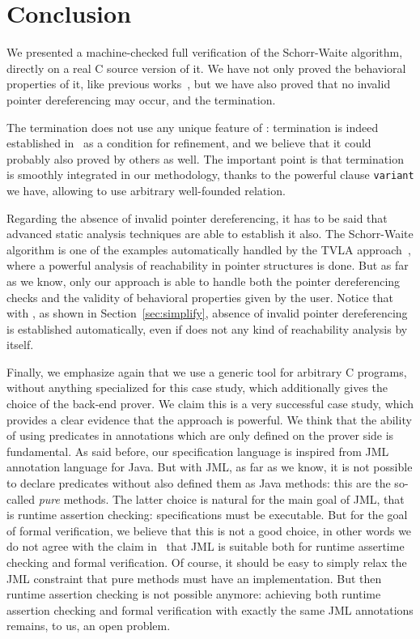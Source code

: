 \section{Conclusion}
\label{sec:conclusion}

We presented a machine-checked full verification of the Schorr-Waite
algorithm, directly on a real C source version of it. We have not only
proved the behavioral properties of it, like previous
works~\cite{bornat00mpc,mehta03cade,abrial03fme}, but we have also
proved that no invalid pointer dereferencing may occur, and the
termination.

The termination does not use any unique feature of \caduceus{}:
termination is indeed established in~\cite{abrial03fme} as a condition
for refinement, and we believe that it could probably also proved by
others as well. The important point is that termination is smoothly
integrated in our methodology, thanks to the powerful clause
\texttt{variant} we have, allowing to use arbitrary well-founded
relation.

Regarding the absence of invalid pointer dereferencing, it has to be
said that advanced static analysis techniques are able to establish it
also. The Schorr-Waite algorithm is one of the examples automatically
handled by the TVLA approach~\cite{sagiv02toplas,reps03esop}, where a powerful
analysis of reachability in pointer structures is done. But as far as
we know, only our approach is able to handle both the pointer
dereferencing checks and the validity of behavioral properties given
by the user. Notice that with \caduceus, as shown in
Section~\ref{sec:simplify}, absence of invalid pointer dereferencing
is established automatically, even if \caduceus{} does not any kind of
reachability analysis by itself.

Finally, we emphasize again that we use a generic tool for arbitrary C
programs, without anything specialized for this case study, which
additionally gives the choice of the back-end prover.  We claim this
is a very successful case study, which provides a clear evidence that
the \caduceus{} approach is powerful. We think that the ability of
using predicates in annotations which are only defined on the prover
side is fundamental. As said before, our specification language is
inspired from JML annotation language for Java. But with JML, as far
as we know, it is not possible to declare predicates without also
defined them as Java methods: this are the so-called \emph{pure}
methods. The latter choice is natural for the main goal of JML, that
is runtime assertion checking: specifications must be executable. But
for the goal of formal verification, we believe that this is not a
good choice, in other words we do not agree with the claim
in~\cite{leavens03a} that JML is suitable both for runtime assertime
checking and formal verification. Of course, it should be easy to
simply relax the JML constraint that pure methods must have an
implementation. But then runtime assertion checking is not possible
anymore: achieving both runtime assertion checking and formal
verification with exactly the same JML annotations remains, to us, an
open problem.

